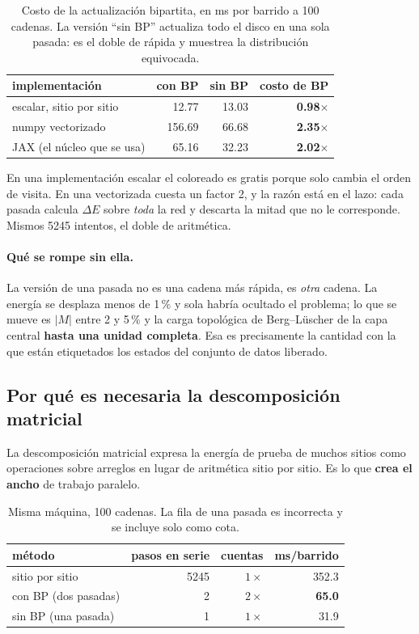 \documentclass[11pt,a4paper]{article}
\begin{document}
\begin{table}[h]\centering
\begin{tabular}{lrrr}
\toprule
implementaci\'on & con BP & sin BP & costo de BP \\
\midrule
escalar, sitio por sitio & 12.77 & 13.03 & \textbf{0.98$\times$} \\
numpy vectorizado        & 156.69 & 66.68 & \textbf{2.35$\times$} \\
JAX (el n\'ucleo que se usa) & 65.16 & 32.23 & \textbf{2.02$\times$} \\
\bottomrule
\end{tabular}
\caption{Costo de la actualizaci\'on bipartita, en ms por barrido a 100 cadenas.
La versi\'on ``sin BP'' actualiza todo el disco en una sola pasada: es el doble de
r\'apida y muestrea la distribuci\'on equivocada.}
\end{table}

En una implementaci\'on escalar el coloreado es gratis porque solo cambia el
orden de visita. En una vectorizada cuesta un factor 2, y la raz\'on est\'a en el
lazo: cada pasada calcula $\Delta E$ sobre \emph{toda} la red y descarta la mitad
que no le corresponde. Mismos \num{5245} intentos, el doble de aritm\'etica.

\paragraph{Qu\'e se rompe sin ella.} La versi\'on de una pasada no es una cadena
m\'as r\'apida, es \emph{otra} cadena. La energ\'ia se desplaza menos de 1\,\% y
sola habr\'ia ocultado el problema; lo que se mueve es $|M|$ entre 2 y 5\,\% y la
carga topol\'ogica de Berg--L\"uscher de la capa central \textbf{hasta una unidad
completa}. Esa es precisamente la cantidad con la que est\'an etiquetados los
estados del conjunto de datos liberado.

\subsection{Por qu\'e es necesaria la descomposici\'on matricial}

La descomposici\'on matricial expresa la energ\'ia de prueba de muchos sitios
como operaciones sobre arreglos en lugar de aritm\'etica sitio por sitio. Es lo
que \textbf{crea el ancho} de trabajo paralelo.

\begin{table}[h]\centering
\begin{tabular}{lrrr}
\toprule
m\'etodo & pasos en serie & cuentas & ms/barrido \\
\midrule
sitio por sitio        & \num{5245} & $1\times$ & 352.3 \\
con BP (dos pasadas)   & 2          & $2\times$ & \textbf{65.0} \\
sin BP (una pasada)    & 1          & $1\times$ & 31.9 \\
\bottomrule
\end{tabular}
\caption{Misma m\'aquina, 100 cadenas. La fila de una pasada es incorrecta y se
incluye solo como cota.}
\end{table}
\end{document}
